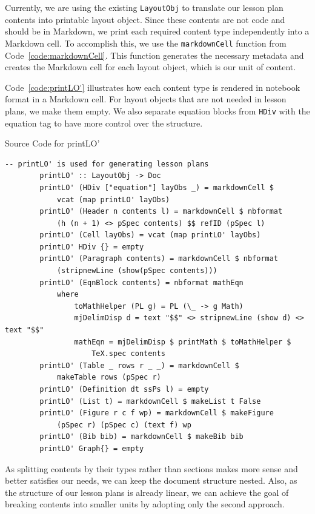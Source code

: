 Currently, we are using the existing \texttt{LayoutObj} to translate our 
lesson plan contents into printable layout object. Since these contents are not 
code and should be in Markdown, we print each required content type 
independently into a Markdown cell. To accomplish this, we use the 
\texttt{markdownCell} function from Code~\ref{code:markdownCell}. This function 
generates the necessary metadata and creates the Markdown cell for each layout 
object, which is our unit of content. 

Code~\ref{code:printLO'} illustrates how each content type is rendered in 
notebook format in a Markdown cell. For layout objects that are not needed in 
lesson plans, we make them empty. We also separate equation blocks from 
\texttt{HDiv} with the equation tag to have more control over the structure.

\begin{listing}[h!]
	\caption{Source Code for printLO'}
	\label{code:printLO'}
	\begin{lstlisting}[language=haskell1, basicstyle=\small\ttfamily]
		-- printLO' is used for generating lesson plans
		printLO' :: LayoutObj -> Doc
		printLO' (HDiv ["equation"] layObs _) = markdownCell $ 
			vcat (map printLO' layObs)
		printLO' (Header n contents l) = markdownCell $ nbformat 
			(h (n + 1) <> pSpec contents) $$ refID (pSpec l)
		printLO' (Cell layObs) = vcat (map printLO' layObs)
		printLO' HDiv {} = empty
		printLO' (Paragraph contents) = markdownCell $ nbformat 
			(stripnewLine (show(pSpec contents)))
		printLO' (EqnBlock contents) = nbformat mathEqn
			where
				toMathHelper (PL g) = PL (\_ -> g Math)
				mjDelimDisp d = text "$$" <> stripnewLine (show d) <> text "$$" 
				mathEqn = mjDelimDisp $ printMath $ toMathHelper $ 
					TeX.spec contents
		printLO' (Table _ rows r _ _) = markdownCell $ 
			makeTable rows (pSpec r)
		printLO' (Definition dt ssPs l) = empty
		printLO' (List t) = markdownCell $ makeList t False
		printLO' (Figure r c f wp) = markdownCell $ makeFigure 
			(pSpec r) (pSpec c) (text f) wp
		printLO' (Bib bib) = markdownCell $ makeBib bib
		printLO' Graph{} = empty
	\end{lstlisting}
\end{listing}

As splitting contents by their types rather than sections makes more sense and 
better satisfies our needs, we can keep the document structure nested. Also, as 
the structure of our lesson plans is already linear, we can achieve the goal of 
breaking contents into smaller units by adopting only the second approach.

